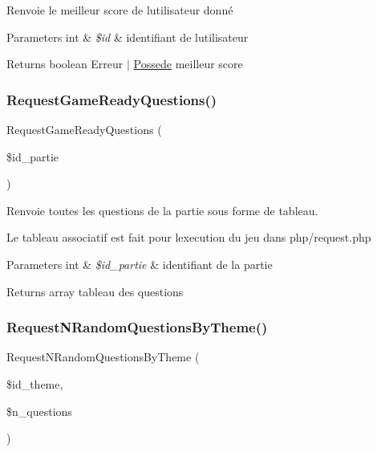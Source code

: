 Renvoie le meilleur score de l\textquotesingle{}utilisateur donné 


\begin{DoxyParams}[1]{Parameters}
int & {\em \$id} & identifiant de l\textquotesingle{}utilisateur\\
\hline
\end{DoxyParams}
\begin{DoxyReturn}{Returns}
boolean Erreur $\vert$ \mbox{\hyperlink{class_possede}{Possede}} meilleur score 
\end{DoxyReturn}
\mbox{\label{class_interface_b_d_d_ab3cac1dc81aaa3b978c19e40f585139d}} 
\subsubsection{\texorpdfstring{Request\+Game\+Ready\+Questions()}{RequestGameReadyQuestions()}}
{\footnotesize\ttfamily Request\+Game\+Ready\+Questions (\begin{DoxyParamCaption}\item[{}]{\$id\+\_\+partie }\end{DoxyParamCaption})}



Renvoie toutes les questions de la partie sous forme de tableau. 

Le tableau associatif est fait pour l\textquotesingle{}execution du jeu dans php/request.\+php


\begin{DoxyParams}[1]{Parameters}
int & {\em \$id\+\_\+partie} & identifiant de la partie\\
\hline
\end{DoxyParams}
\begin{DoxyReturn}{Returns}
array tableau des questions 
\end{DoxyReturn}
\mbox{\label{class_interface_b_d_d_aa55c97f41f0473692fa3c3be52b16d91}} 
\subsubsection{\texorpdfstring{Request\+N\+Random\+Questions\+By\+Theme()}{RequestNRandomQuestionsByTheme()}}
{\footnotesize\ttfamily Request\+N\+Random\+Questions\+By\+Theme (\begin{DoxyParamCaption}\item[{}]{\$id\+\_\+theme,  }\item[{}]{\$n\+\_\+questions }\end{DoxyParamCaption})}



